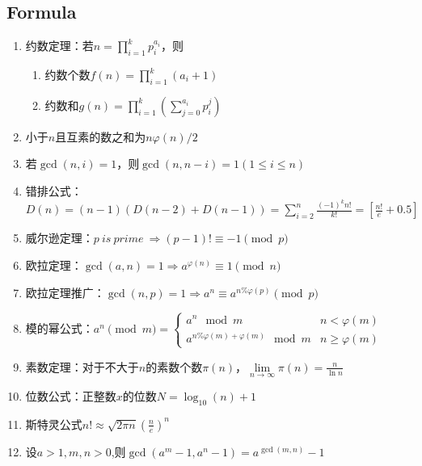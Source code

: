 \documentclass[twoside]{article}
\begin{document}
\subsection{Formula}
\begin{enumerate}
    \item 约数定理：若$n=\prod_{i=1}^kp_i^{a_i}$，则
    
    \begin{enumerate}
    \item 约数个数$f(n)=\prod_{i=1}^k(a_i+1)$
    \item 约数和$g(n)=\prod_{i=1}^k(\sum_{j=0}^{a_i}p_i^j)$
    \end{enumerate}
    
    \item 小于$n$且互素的数之和为$n\varphi(n)/2$
    
    \item 若$\gcd(n,i)=1$，则$\gcd(n,n-i)=1(1\leq i\leq n)$
    
    \item 错排公式：$D(n)=(n-1)(D(n-2)+D(n-1))=\sum_{i=2}^n\frac{(-1)^kn!}{k!}=[\frac{n!}{e}+0.5]$
    
    \item 威尔逊定理：$p\ is\ prime\ \Rightarrow (p-1)!\equiv-1\pmod p$
    
    \item 欧拉定理：$\gcd(a,n)=1\Rightarrow a^{\varphi(n)}\equiv1\pmod n$
    
    \item 欧拉定理推广：$\gcd(n,p)=1\Rightarrow a^n\equiv a^{n\%\varphi(p)}\pmod p$
    
    \item 模的幂公式：$a ^ n \pmod {m} = 
    \begin{cases}
    a ^ n \mod m & n < \varphi(m)\\
    a ^ {n \% \varphi(m) + \varphi(m)} \mod m & n \ge \varphi(m)
    \end{cases}
    $
    
    \item 素数定理：对于不大于$n$的素数个数$\pi(n)$，$\lim\limits_{n\to\infty}\pi(n)=\frac{n}{\ln n}$
    
    \item 位数公式：正整数$x$的位数$N=\log_{10}(n)+1$
    
    \item 斯特灵公式$n!\approx\sqrt{2\pi n}(\frac{n}{e})^n$
    
    \item 设$a>1,m,n>0$,则$\gcd(a^m-1,a^n-1)=a^{\gcd(m,n)}-1$
    

\end{enumerate}
\end{document}
